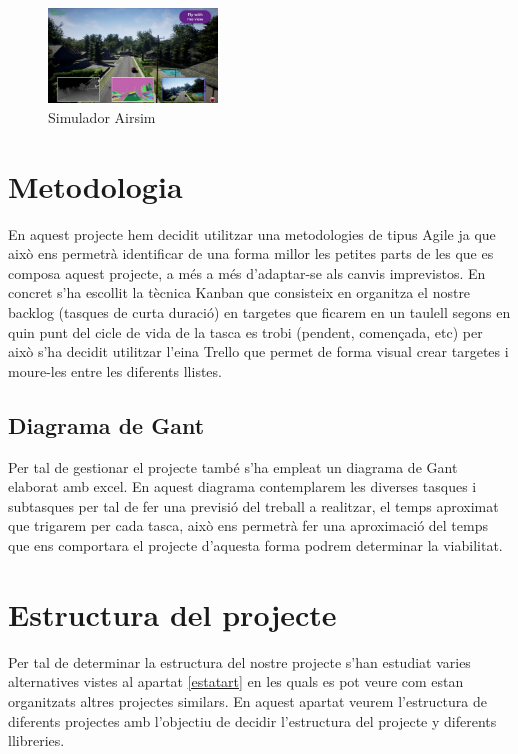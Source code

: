 \documentclass[10pt,a4paper,twocolumn,twoside]{article}
\begin{document}
\begin{figure}[!h]
\centering
  	\includegraphics[width=0.4\textwidth]{airsim}
	\caption{Simulador Airsim}
	\label{fig-airsim}
\end{figure}


\section{Metodologia}

En aquest projecte hem decidit utilitzar una metodologies de tipus Agile \cite{agile} ja que això ens permetrà identificar de una forma millor les petites parts de les que es composa aquest projecte, a més a més d'adaptar-se als canvis imprevistos. En concret s'ha escollit la tècnica Kanban \cite{kanban} que consisteix en organitza el nostre backlog (tasques de curta duració) en 
targetes que ficarem en un taulell segons en quin punt del cicle de vida de la tasca es trobi (pendent, començada, etc) per això s'ha decidit utilitzar l'eina Trello \cite{trello} que permet de forma visual crear targetes i moure-les entre les diferents llistes.

\subsection{Diagrama de Gant}

Per tal de gestionar el projecte també s'ha empleat un diagrama de Gant elaborat amb excel. En aquest diagrama contemplarem les diverses tasques i subtasques per tal de fer una previsió del treball a realitzar, el temps aproximat que trigarem per cada tasca, això ens permetrà fer una aproximació del temps que ens comportara el projecte d'aquesta forma podrem determinar la viabilitat.

\section{Estructura del projecte}

Per tal de determinar la estructura del nostre projecte s'han estudiat varies alternatives vistes al apartat \ref{estatart} en les quals es pot veure com estan organitzats altres projectes similars. En aquest apartat veurem l'estructura de diferents projectes amb l'objectiu de decidir l'estructura del projecte y diferents llibreries.
\end{document}
